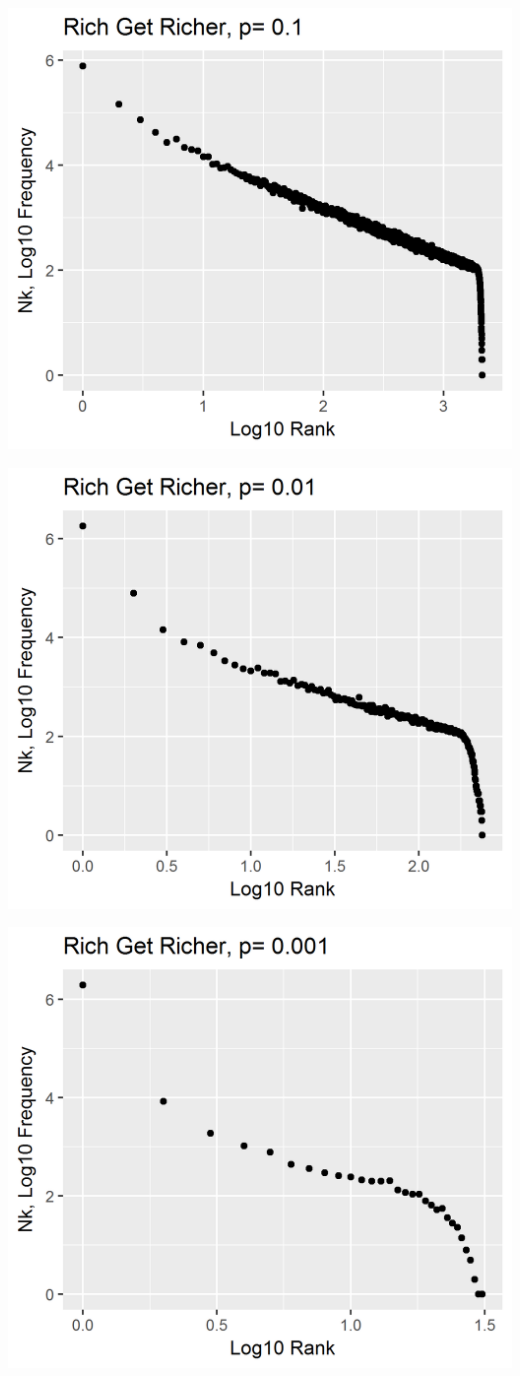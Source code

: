 \includegraphics{../images/Problem1_p0_1.png}

\includegraphics{../images/Problem1_p0_01.png}

\includegraphics{../images/Problem1_p0_001.png}